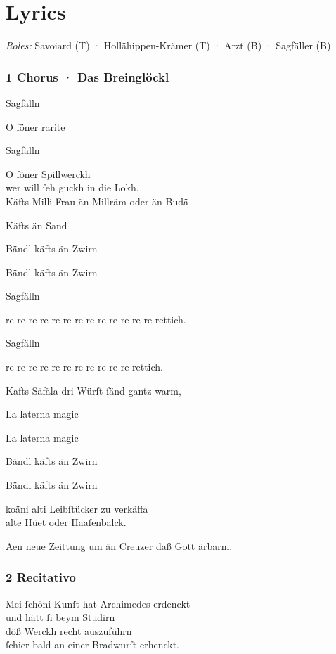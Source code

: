 \documentclass{ees}
\newenvironment{lyrics}[1]{%
  \subsection{#1}\nopagebreak%
  \begin{lyricslist}%
  \let\voice\item%
}{%
  \end{lyricslist}%
}
\begin{document}
\cleardoublepage
\chapter{Lyrics}

\textit{Roles:} Savoiard (T) · Hollähippen-Krämer (T) · Arzt (B) · Sagfäller (B)
\enlargethispage{2\baselineskip}

\begin{lyrics}{1 Chorus · Das Breinglöckl}
  \voice[Sagfäller]
  Sagfälln

  \voice[Savoiard]
  O ſöner rarite

  \voice[Arzt]
  Sagfälln

  \voice[Savoiard]
  O ſöner Spillwerckh\\
  wer will ſeh guckh in die Lokh.\\
  Käfts Milli Frau än Millräm oder än Budä

  \voice[H.-Krämer]
  Käfts än Sand

  \voice[Sagfäller]
  Bändl käfts än Zwirn

  \voice[Arzt]
  Bändl käfts än Zwirn

  \voice[Sagfäller]
  Sagfälln

  \voice[Savoiard]
  re re re re re re re re re re re re re rettich.

  \voice[Arzt]
  Sagfälln

  \voice[H.-Krämer]
  re re re re re re re re re re re rettich.

  \voice[Sagfäller]
  Kafts Säfäla dri Würſt ſänd gantz warm,

  \voice[Savoiard]
  La laterna magic

  \voice[H.-Krämer]
  La laterna magic

  \voice[Arzt]
  Bändl käfts än Zwirn

  \voice[Sagfäller]
  Bändl käfts än Zwirn

  \voice[Savoiard]
  koäni alti Leibſtücker zu verkäffa\\
  alte Hüet oder Haaſenbalck.

  \voice[alle]
  Aen neue Zeittung um än Creuzer daß Gott ärbarm.
\end{lyrics}

\begin{lyrics}{2 Recitativo}
  \voice[Sagfäller]
  Mei ſchöni Kunſt hat Archimedes erdenckt\\
  und hätt ſi beym Studirn\\
  döß Werckh recht auszuführn\\
  ſchier bald an einer Bradwurſt erhenckt.
\end{lyrics}
\end{document}
